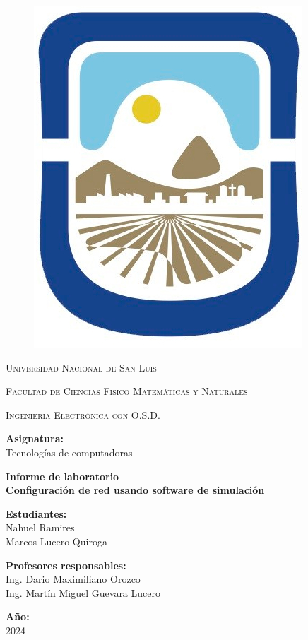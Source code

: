 \documentclass{article}
\begin{document}
\begin{titlepage}	  
\centering

\begin{figure}
\centering
\includegraphics[width=0.15\linewidth]{logo-unsl.jpg}
\end{figure}     

{\scshape\LARGE Universidad Nacional de San Luis\par}
{\scshape Facultad de Ciencias Físico Matemáticas y Naturales\par}
{\scshape Ingeniería Electrónica con O.S.D.\par}
\bigskip 
\bigskip 
\bigskip 

\Large \textbf {Asignatura:\\} 
\LARGE Tecnologías de computadoras
\bigskip 
\bigskip 
\bigskip
\bigskip

\LARGE \textbf {Informe de laboratorio\\}
\bigskip
\LARGE \textbf {Configuración de red usando software de
simulación}
 
\bigskip
\bigskip
\bigskip

\LARGE \textbf {Estudiantes:\\} 
	\LARGE Nahuel Ramires\\ Marcos Lucero Quiroga

\bigskip


\bigskip
\bigskip
\bigskip
\bigskip
\bigskip
\bigskip

\Large \textbf {Profesores responsables:\\} 
\Large  Ing. Dario Maximiliano Orozco \\ Ing. Martín Miguel Guevara Lucero 
\bigskip
\bigskip
\bigskip
\bigskip
\bigskip
\bigskip
\bigskip
\bigskip
\bigskip

\Large \textbf {Año:\\} 
\Large 2024	
\end{titlepage}
\newpage

\end{document}
